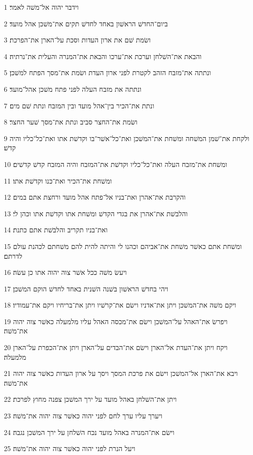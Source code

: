 \par 1 וידבר יהוה אל־משׁה לאמר׃
\par 2 ביום־החדשׁ הראשׁון באחד לחדשׁ תקים את־משׁכן אהל מועד׃
\par 3 ושׂמת שׁם את ארון העדות וסכת על־הארן את־הפרכת׃
\par 4 והבאת את־השׁלחן וערכת את־ערכו והבאת את־המנרה והעלית את־נרתיה׃
\par 5 ונתתה את־מזבח הזהב לקטרת לפני ארון העדת ושׂמת את־מסך הפתח למשׁכן׃
\par 6 ונתתה את מזבח העלה לפני פתח משׁכן אהל־מועד׃
\par 7 ונתת את־הכיר בין־אהל מועד ובין המזבח ונתת שׁם מים׃
\par 8 ושׂמת את־החצר סביב ונתת את־מסך שׁער החצר׃
\par 9 ולקחת את־שׁמן המשׁחה ומשׁחת את־המשׁכן ואת־כל־אשׁר־בו וקדשׁת אתו ואת־כל־כליו והיה קדשׁ׃
\par 10 ומשׁחת את־מזבח העלה ואת־כל־כליו וקדשׁת את־המזבח והיה המזבח קדשׁ קדשׁים׃
\par 11 ומשׁחת את־הכיר ואת־כנו וקדשׁת אתו׃
\par 12 והקרבת את־אהרן ואת־בניו אל־פתח אהל מועד ורחצת אתם במים׃
\par 13 והלבשׁת את־אהרן את בגדי הקדשׁ ומשׁחת אתו וקדשׁת אתו וכהן לי׃
\par 14 ואת־בניו תקריב והלבשׁת אתם כתנת׃
\par 15 ומשׁחת אתם כאשׁר משׁחת את־אביהם וכהנו לי והיתה להית להם משׁחתם לכהנת עולם לדרתם׃
\par 16 ויעשׂ משׁה ככל אשׁר צוה יהוה אתו כן עשׂה׃
\par 17 ויהי בחדשׁ הראשׁון בשׁנה השׁנית באחד לחדשׁ הוקם המשׁכן׃
\par 18 ויקם משׁה את־המשׁכן ויתן את־אדניו וישׂם את־קרשׁיו ויתן את־בריחיו ויקם את־עמודיו׃
\par 19 ויפרשׂ את־האהל על־המשׁכן וישׂם את־מכסה האהל עליו מלמעלה כאשׁר צוה יהוה את־משׁה׃
\par 20 ויקח ויתן את־העדת אל־הארן וישׂם את־הבדים על־הארן ויתן את־הכפרת על־הארן מלמעלה׃
\par 21 ויבא את־הארן אל־המשׁכן וישׂם את פרכת המסך ויסך על ארון העדות כאשׁר צוה יהוה את־משׁה׃
\par 22 ויתן את־השׁלחן באהל מועד על ירך המשׁכן צפנה מחוץ לפרכת׃
\par 23 ויערך עליו ערך לחם לפני יהוה כאשׁר צוה יהוה את־משׁה׃
\par 24 וישׂם את־המנרה באהל מועד נכח השׁלחן על ירך המשׁכן נגבה׃
\par 25 ויעל הנרת לפני יהוה כאשׁר צוה יהוה את־משׁה׃
